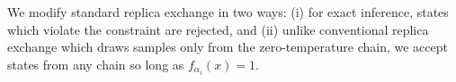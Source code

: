 We modify standard replica exchange in two ways: (i) for exact inference, states which violate the constraint are rejected, and (ii)
unlike conventional replica exchange which draws samples only from the zero-temperature chain, we accept states from any chain so long as $f_{\alpha_i}(x) = 1$.








